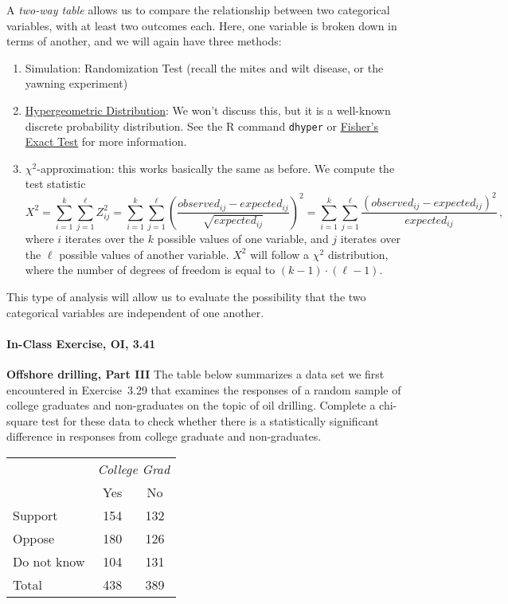 \documentclass[10pt]{article}\usepackage[]{graphicx}\usepackage[]{color}
\newcommand{\R}{{\sf R}\xspace}
\newcommand{\cmd}[1]{\texttt{#1}}
\begin{document}
A \emph{two-way table} allows us to compare the relationship between two categorical variables, with at least two outcomes each. Here, one variable is broken down in terms of another, and we will again have three methods:
\begin{enumerate}
  \item Simulation: Randomization Test (recall the mites and wilt disease, or the yawning experiment)
  \item \href{http://en.wikipedia.org/wiki/Hypergeometric_distribution}{Hypergeometric Distribution}: We won't discuss this, but it is a well-known discrete probability distribution. See the \R command \cmd{dhyper} or \href{http://en.wikipedia.org/wiki/Fisher%27s\_exact_test}{Fisher's Exact Test} for more information. 
  \item $\chi^2$-approximation: this works basically the same as before. We compute the test statistic
  $$
  X^2 = \sum_{i=1}^k \sum_{j=1}^\ell Z_{ij}^2 = \sum_{i=1}^k \sum_{j=1}^\ell \left( \frac{observed_{ij} - expected_{ij}}{\sqrt{expected_{ij}}} \right)^2 = \sum_{i=1}^k \sum_{j=1}^\ell \frac{(observed_{ij} - expected_{ij})^2}{expected_{ij}} \,,
  $$
  where $i$ iterates over the $k$ possible values of one variable, and $j$ iterates over the $\ell$ possible values of another variable. $X^2$ will follow a $\chi^2$ distribution, where the number of degrees of freedom is equal to $(k-1) \cdot (\ell - 1)$. 
\end{enumerate}

This type of analysis will allow us to evaluate the possibility that the two categorical variables are independent of one another. 


\paragraph{In-Class Exercise, OI, 3.41}

\textbf{Offshore drilling, Part III} The table below summarizes a data set we first encountered in Exercise~3.29 that examines the responses of a random sample of college graduates and non-graduates on the topic of oil drilling. Complete a chi-square test for these data to check whether there is a statistically significant difference in responses from college graduate and non-graduates.
\begin{center}
\begin{tabular}{l c c}
  			& \multicolumn{2}{c}{\textit{College Grad}} \\
\cline{2-3}
						& Yes		& No				\\
\cline{2-3}
Support		& 154		& 132			\\
Oppose		& 180		& 126			\\
Do not know	& 104		& 131			\\
\cline{1-3}
 Total		& 438		& 389		
\end{tabular}
\end{center}
\end{document}
